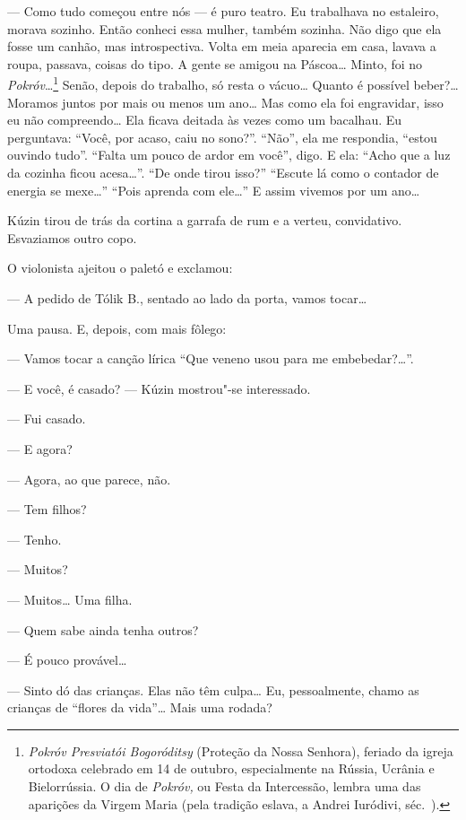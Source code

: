 --- Como tudo começou entre nós --- é puro teatro. Eu trabalhava no
estaleiro, morava sozinho. Então conheci essa mulher, também sozinha.
Não digo que ela fosse um canhão, mas introspectiva. Volta em meia
aparecia em casa, lavava a roupa, passava, coisas do tipo. A gente se
amigou na Páscoa\ldots{} Minto, foi no \emph{Pokróv}\ldots{}\footnote{\emph{Pokróv
  Presviatói Bogoróditsy} (Proteção da Nossa Senhora), feriado da igreja
  ortodoxa celebrado em 14 de outubro, especialmente na Rússia, Ucrânia
  e Bielorrússia. O dia de \emph{Pokróv,} ou Festa da Intercessão,
  lembra uma das aparições da Virgem Maria (pela tradição eslava, a
  Andrei Iuródivi, séc.~).} Senão, depois do trabalho, só resta o
vácuo\ldots{} Quanto é possível beber?\ldots{} Moramos juntos por mais ou menos um
ano\ldots{} Mas como ela foi engravidar, isso eu não compreendo\ldots{} Ela ficava
deitada às vezes como um bacalhau. Eu perguntava: ``Você, por acaso,
caiu no sono?''. ``Não'', ela me respondia, ``estou ouvindo tudo''.
``Falta um pouco de ardor em você'', digo. E ela: ``Acho que a luz da
cozinha ficou acesa\ldots{}''. ``De onde tirou isso?'' ``Escute lá como o
contador de energia se mexe\ldots{}'' ``Pois aprenda com ele\ldots{}'' E assim
vivemos por um ano\ldots{}

Kúzin tirou de trás da cortina a garrafa de rum e a verteu, convidativo.
Esvaziamos outro copo.

O violonista ajeitou o paletó e exclamou:

--- A pedido de Tólik B., sentado ao lado da porta, vamos tocar\ldots{}

Uma pausa. E, depois, com mais fôlego:

--- Vamos tocar a canção lírica ``Que veneno usou para me
embebedar?\ldots{}''.

--- E você, é casado? --- Kúzin mostrou"-se interessado.

--- Fui casado.

--- E agora?

--- Agora, ao que parece, não.

--- Tem filhos?

--- Tenho.

--- Muitos?

--- Muitos\ldots{} Uma filha.

--- Quem sabe ainda tenha outros?

--- É pouco provável\ldots{}

--- Sinto dó das crianças. Elas não têm culpa\ldots{} Eu, pessoalmente, chamo
as crianças de ``flores da vida''\ldots{} Mais uma rodada?

